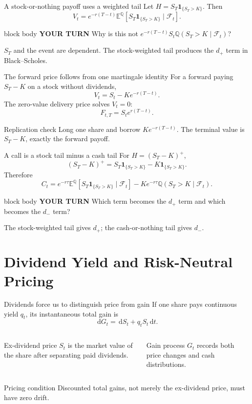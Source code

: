 \documentclass[handout,10pt,aspectratio=169]{beamer}
\newenvironment{pausebox}{\begin{beamercolorbox}[rounded=true,sep=0.8em,wd=\textwidth]{block body}
  \textbf{\color{CourseGold}YOUR TURN}\quad}{\end{beamercolorbox}}
\newcommand{\dd}{\,\mathrm d}
\newcommand{\E}{\mathbb E}
\newcommand{\Q}{\mathbb Q}
\newcommand{\cF}{\mathcal F}
\newcommand{\1}{\mathbf 1}
\begin{document}
\begin{frame}{A stock-or-nothing payoff uses a weighted tail}
Let \(H=S_T\1_{\{S_T>K\}}\). Then
\[
V_t=e^{-r(T-t)}
\E^\Q[S_T\1_{\{S_T>K\}}\mid\cF_t].
\]
\begin{pausebox}
Why is this not
\(e^{-r(T-t)}S_t\Q(S_T>K\mid\cF_t)\)?
\end{pausebox}

\(S_T\) and the event are dependent. The stock-weighted tail produces the
\(d_+\) term in Black--Scholes.
\end{frame}


\begin{frame}{The forward price follows from one martingale identity}
For a forward paying \(S_T-K\) on a stock without dividends,
\[
\boxed{V_t=S_t-Ke^{-r(T-t)}.}
\]
The zero-value delivery price solves \(V_t=0\):
\[
\boxed{F_{t,T}=S_te^{r(T-t)}.}
\]
\begin{exampleblock}{Replication check}
Long one share and borrow \(Ke^{-r(T-t)}\). The terminal value is
\(S_T-K\), exactly the forward payoff.
\end{exampleblock}
\end{frame}

\begin{frame}{A call is a stock tail minus a cash tail}
For \(H=(S_T-K)^+\),
\[
(S_T-K)^+
=S_T\1_{\{S_T>K\}}-K\1_{\{S_T>K\}}.
\]
Therefore
\[
C_t=e^{-r\tau}
\E^\Q[S_T\1_{\{S_T>K\}}\mid\cF_t]
-Ke^{-r\tau}\Q(S_T>K\mid\cF_t).
\]
\begin{pausebox}
Which term becomes the \(d_+\) term and which becomes the \(d_-\) term?
\end{pausebox}

The stock-weighted tail gives \(d_+\); the cash-or-nothing tail gives \(d_-\).
\end{frame}


\section{Dividend Yield and Risk-Neutral Pricing}

\begin{frame}{Dividends force us to distinguish price from gain}
If one share pays continuous yield \(q_t\), its instantaneous total gain is
\[
\boxed{\dd G_t=\dd S_t+q_tS_t\dd t.}
\]
\begin{columns}[T,onlytextwidth]
\begin{block}{Ex-dividend price}
\(S_t\) is the market value of the share after separating paid dividends.
\end{block}
\begin{exampleblock}{Gain process}
\(G_t\) records both price changes and cash distributions.
\end{exampleblock}
\end{columns}
\begin{alertblock}{Pricing condition}
Discounted total gains, not merely the ex-dividend price, must have zero drift.
\end{alertblock}
\end{frame}
\end{document}
